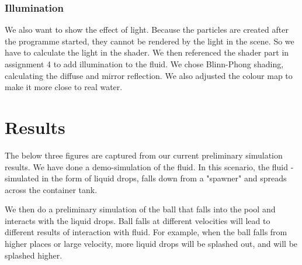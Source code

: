 \documentclass{article}
\begin{document}
\subsubsection{Illumination}
\hspace{1em} We also want to show the effect of light. Because the particles are created after the programme started, they cannot be rendered by the light in the scene. So we have to calculate the light in the shader. We then referenced the shader part in assignment 4 to add illumination to the fluid. We chose Blinn-Phong shading, calculating the diffuse and mirror reflection. We also adjusted the colour map to make it more close to real water.

\section{Results}

\hspace{1em} The below three figures are captured from our current preliminary simulation results. We have done a demo-simulation of the fluid. In this scenario, the fluid - simulated in the form of liquid drops, falls down from a "spawner" and spreads across the container tank. 

We then do a preliminary simulation of the ball that falls into the pool and interacts with the liquid drops. Ball falls at different velocities will lead to different results of interaction with fluid. For example, when the ball falls from higher places or large velocity, more liquid drops will be splashed out, and will be splashed higher. 
\end{document}

